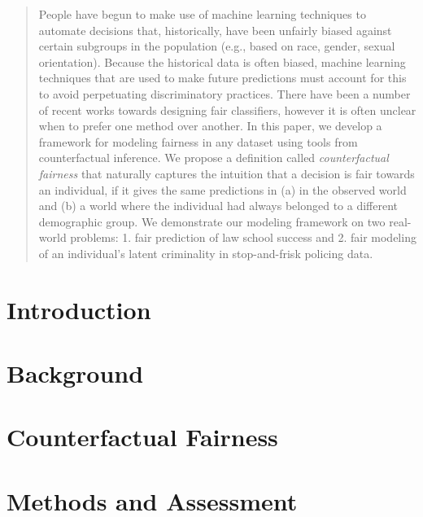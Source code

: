 \documentclass{article}
\begin{document}
\begin{abstract} 
  People have begun to make use of machine learning techniques to
  automate decisions that, historically, have been unfairly biased
  against certain subgroups in the population (e.g., based on race,
  gender, sexual orientation). %
  Because the historical data is often biased, machine learning
  techniques that are used to make future predictions must account for
  this to avoid perpetuating discriminatory practices. There have been
  a number of recent works towards designing fair classifiers, however
  it is often unclear when to prefer one method over another. In this
  paper, we develop a framework for modeling fairness in any dataset
  using tools from counterfactual inference. We propose a definition
  called \emph{counterfactual fairness} that naturally captures the
  intuition that a decision is fair towards an individual, if it gives
  the same predictions in (a) in the observed world and (b) a world
  where the individual had always belonged to a different demographic
  group. We demonstrate our modeling framework on two real-world
  problems: 1. fair prediction of law school success and 2. fair
  modeling of an individual's latent criminality in stop-and-frisk
  policing data.
\end{abstract} 

\section{Introduction}
\label{introduction}



\section{Background}
\label{background}


\section{Counterfactual Fairness}
\label{sec:count_fair}



\section{Methods and Assessment}
\label{sec:methods}

\end{document}
